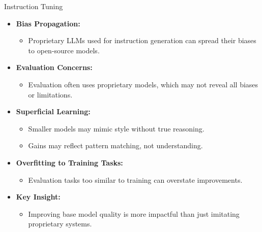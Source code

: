 \begin{frame}[allowframebreaks]{Instruction Tuning}
\begin{itemize}
\begin{itemize}
            \end{itemize}
            \item \textbf{Bias Propagation:}
            \begin{itemize}
                \item Proprietary LLMs used for instruction generation can spread their biases to open-source models.
            \end{itemize}
            \item \textbf{Evaluation Concerns:}
            \begin{itemize}
                \item Evaluation often uses proprietary models, which may not reveal all biases or limitations.
            \end{itemize}
            \framebreak
            \item \textbf{Superficial Learning:}
            \begin{itemize}
                \item Smaller models may mimic style without true reasoning.
                \item Gains may reflect pattern matching, not understanding.
            \end{itemize}
            \item \textbf{Overfitting to Training Tasks:}
            \begin{itemize}
                \item Evaluation tasks too similar to training can overstate improvements.
            \end{itemize}
            \item \textbf{Key Insight:}
            \begin{itemize}
                \item Improving base model quality is more impactful than just imitating proprietary systems.
            \end{itemize}
        \end{itemize}
\end{frame}